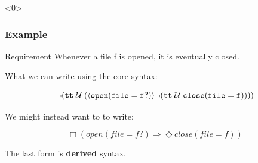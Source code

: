 \begin{frame}<0>
  \frametitle{Example} \small

\begin{block}{Requirement}
Whenever a file f is opened, it is eventually closed.
\end{block}

What we can write using the core syntax:

\[
\neg (\tt{tt} \;{\cal U}\; (\langle open(file=f?)\rangle \neg(\tt{tt} \;{\cal U}\; close(file=f))))
\]

\pause

We might instead want to to write:




\[
\Box (open(file=f?) \Rightarrow \Diamond close(file=f))
\]

\vspace{0.2cm}


The last form is {\bf derived} syntax.

\end{frame}


